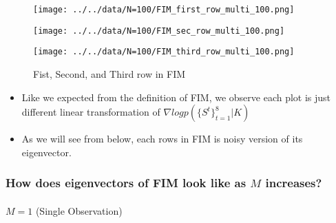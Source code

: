 \documentclass[
]{article}
\makeatletter
\let\oldparagraph\paragraph
\renewcommand{\paragraph}{
    \@ifstar
      \xxxParagraphStar
      \xxxParagraphNoStar
  }
\newcommand{\xxxParagraphStar}[1]{\oldparagraph*{#1}\mbox{}}
\newcommand{\xxxParagraphNoStar}[1]{\oldparagraph{#1}\mbox{}}
\providecommand{\tightlist}{%
  \setlength{\itemsep}{0pt}\setlength{\parskip}{0pt}}\usepackage{longtable,booktabs,array}
\makeatother
\begin{document}
\begin{figure}

\begin{minipage}{0.33\linewidth}

\texttt{[image: ../../data/N=100/FIM\_first\_row\_multi\_100.png]}

\end{minipage}%
%
\begin{minipage}{0.33\linewidth}

\texttt{[image: ../../data/N=100/FIM\_sec\_row\_multi\_100.png]}

\end{minipage}%
%
\begin{minipage}{0.33\linewidth}

\texttt{[image: ../../data/N=100/FIM\_third\_row\_multi\_100.png]}

\end{minipage}%

\caption{\label{fig-fimrow}Fist, Second, and Third row in FIM}

\end{figure}%

\begin{itemize}
\tightlist
\item
  Like we expected from the definition of FIM, we observe each plot is
  just different linear transformation of
  \(\nabla log p(\{S^t\}^8_{t=1}|K)\)
\item
  As we will see from below, each rows in FIM is noisy version of its
  eigenvector.
\end{itemize}

\subsubsection{\texorpdfstring{How does eigenvectors of FIM look like as
\(M\)
increases?}{How does eigenvectors of FIM look like as M increases?}}\label{how-does-eigenvectors-of-fim-look-like-as-m-increases}

\paragraph{\texorpdfstring{\(M = 1\) (Single
Observation)}{M = 1 (Single Observation)}}\label{m-1-single-observation}
\end{document}
